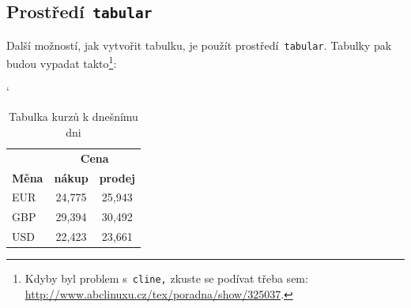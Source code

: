 \documentclass[a4paper, 11pt, ]{article}
\begin{document}
\subsection{Prostředí\texttt{ tabular }}
Další možností, jak vytvořit tabulku, je použít prostředí\texttt{ tabular}. Tabulky pak 
budou vypadat takto\footnote{Kdyby byl problem s\texttt{ cline,} zkuste se podívat třeba sem: 
\href{http://www.abclinuxu.cz/tex/poradna/show/325037}{http://www.abclinuxu.cz/tex/poradna/show/325037}.}:
\bigskip
\begin{table}[h]
    \begin{center}
    \catcode`
    	\begin{tabular}{|l|c|c|}
        	\hline
        	& \multicolumn{2}{c|}{\textbf{Cena}} \\ \cline{2-3}
        	\textbf{Měna} & \textbf{nákup} & \textbf{prodej} \\ \hline
        	EUR	& 24,775 & 25,943 \\
        	GBP	& 29,394 & 30,492 \\
        	USD	& 22,423 & 23,661 \\ 
        	\hline
    	\end{tabular}
    \caption{Tabulka kurzů k dnešnímu dni}
    \label{table:1}
    \end{center}
\end{table}
\end{document}
